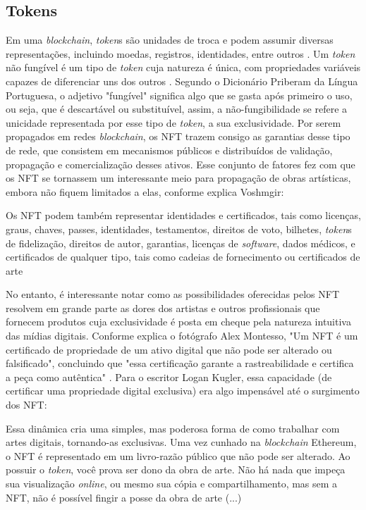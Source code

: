 \subsection{Tokens}
\label{subsec: tokens}
Em uma \textit{blockchain}, \textit{token}s são unidades de troca e podem assumir diversas representações, incluindo moedas, registros, identidades, entre outros \cite{Antonopoulos, Voshmgir}. Um \textit{token} não fungível é um tipo de \textit{token} cuja natureza é única, com propriedades variáveis capazes de diferenciar uns dos outros \cite{Voshmgir}. Segundo o Dicionário Priberam da Língua Portuguesa, o adjetivo "fungível" significa algo que se gasta após primeiro o uso, ou seja, que é descartável ou substituível, assim, a não-fungibilidade se refere a unicidade representada por esse tipo de \textit{token}, a sua exclusividade. Por serem propagados em redes \textit{blockchain}, os NFT trazem consigo as garantias desse tipo de rede, que consistem em mecanismos públicos e distribuídos de validação, propagação e comercialização desses ativos. Esse conjunto de fatores fez com que os NFT se tornassem um interessante meio para propagação de obras artísticas, embora não fiquem limitados a elas, conforme explica Voshmgir:

\begin{citacao}
	 Os NFT podem também representar identidades e certificados, tais como licenças, graus, chaves, passes, identidades, testamentos, direitos de voto, bilhetes, \textit{token}s de fidelização, direitos de autor, garantias, licenças de \textit{software}, dados médicos, e certificados de qualquer tipo, tais como cadeias de fornecimento ou certificados de arte \cite{Voshmgir}
\end{citacao}

No entanto, é interessante notar como as possibilidades oferecidas pelos NFT resolvem em grande parte as dores dos artistas e outros profissionais que fornecem produtos cuja exclusividade é posta em cheque pela natureza intuitiva das mídias digitais. Conforme explica o fotógrafo Alex Montesso, "Um NFT é um certificado de propriedade de um ativo digital que não pode ser alterado ou falsificado", concluindo que "essa certificação garante a rastreabilidade e certifica a peça como autêntica" \cite{Montesso}. Para o escritor Logan Kugler, essa capacidade (de certificar uma propriedade digital exclusiva) era algo impensável até o surgimento dos NFT: 

\begin{citacao}
Essa dinâmica cria uma simples, mas poderosa forma de como trabalhar com artes digitais, tornando-as exclusivas. Uma vez cunhado na \textit{blockchain} Ethereum, o NFT é representado em um livro-razão público que não pode ser alterado. Ao possuir o \textit{token}, você prova ser dono da obra de arte. Não há nada que impeça sua visualização \textit{online}, ou mesmo sua cópia e compartilhamento, mas sem a NFT, não é possível fingir a posse da obra de arte (...) 
\end{citacao}

